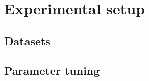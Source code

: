 \chapter{Experimental setup}
\label{chap:Experimental setup}


\section{Datasets}
\label{sec:datasets}

\section{Parameter tuning}
\label{sec:parametertuning}









